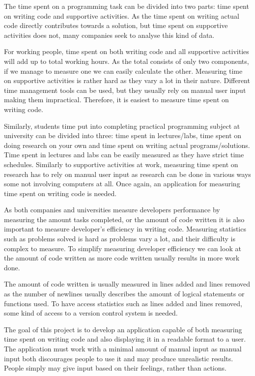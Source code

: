 The time spent on a programming task can be divided into two parts: time spent on writing code and supportive activities.
As the time spent on writing actual code directly contributes towards a solution, but time spent on supportive activities does not,
many companies seek to analyse this kind of data.

For working people, time spent on both writing code and all supportive activities will add up to total working hours.
As the total consists of only two components, if we manage to measure one we can easily calculate the other.
Measuring time on supportive activities is rather hard as they vary a lot in their nature.
Different time management tools can be used, but they usually rely on manual user input making them impractical.
Therefore, it is easiest to measure time spent on writing code.

Similarly, students time put into completing practical programming subject at university can be divided into three: time spent in lectures/labs,
time spent on doing research on your own and time spent on writing actual programs/solutions.
Time spent in lectures and labs can be easily measured as they have strict time schedules.
Similarly to supportive activities at work, measuring time spent on research has to rely on manual user input as research can be done in various ways some not involving computers at all.
Once again, an application for measuring time spent on writing code is needed.

As both companies and universities measure developers performance by measuring the amount tasks completed,
or the amount of code written it is also important to measure developer's efficiency in writing code.
Measuring statistics such as problems solved is hard as problems vary a lot, and their difficulty is complex to measure.
To simplify measuring developer efficiency we can look at the amount of code written as more code written usually results in more work done.

The amount of code written is usually measured in lines added and lines removed as the number of newlines usually describes the amount
of logical statements or functions used.
To have access statistics such as lines added and lines removed, some kind of access to a version control system is needed.

The goal of this project is to develop an application capable of both measuring time spent on writing code and also
displaying it in a readable format to a user.
The application must work with a minimal amount of manual input as manual input both discourages people to use it and may produce
unrealistic results.
People simply may give input based on their feelings, rather than actions.


